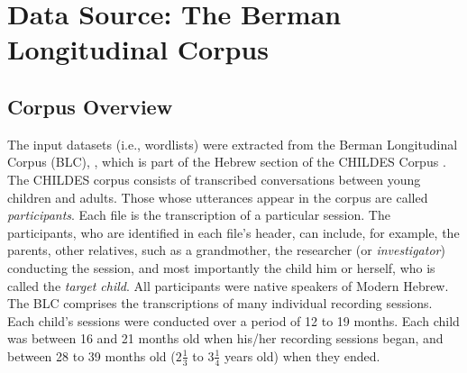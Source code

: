 \section{Data Source: The Berman Longitudinal Corpus}

\subsection{Corpus Overview}
The input datasets (i.e., wordlists) were extracted from the Berman Longitudinal Corpus (BLC),
\citep{berman-weissenborn:1991},
which is part of the Hebrew section of the CHILDES Corpus \citep{macwhinney:2000a}. 
The CHILDES corpus consists of transcribed 
conversations between young children and adults. Those whose utterances appear in the corpus are
called \emph{participants}. Each file is the transcription of a particular session. 
The participants, who are identified in each file's
header, can include, for example, the parents,
 other relatives, such as a grandmother, 
the researcher (or \emph{investigator}) conducting the session, and most importantly the child him or herself, who is called
the \emph{target child}. All participants were native speakers of Modern Hebrew. %
The BLC comprises the transcriptions of many individual recording sessions. Each child's sessions 
were conducted over a period of 12 to 19 months.
Each child was between 16 and 21 months old when his/her 
recording sessions began, and between 28 to 39 months old ($2\frac{1}{3}$ to $3\frac{1}{4}$ years old) when they ended.


